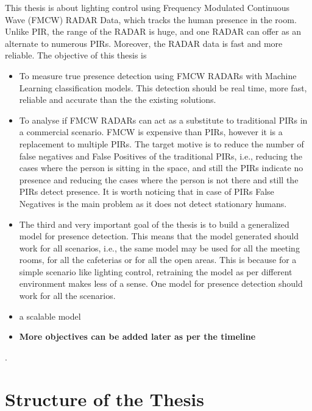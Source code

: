 This thesis is about lighting control using Frequency Modulated Continuous Wave (FMCW) RADAR Data, which tracks the human presence in the room. 
Unlike PIR, the range of the RADAR is huge, and one RADAR can offer as an alternate to numerous PIRs. Moreover, the RADAR data is fast and more reliable. The objective of this thesis is 
\begin{itemize}
    \item To measure true presence detection using FMCW RADARs with Machine Learning classification models. This detection should be real time, more fast, reliable and accurate than the the existing solutions.
    \item To analyse if FMCW RADARs can act as a substitute to traditional PIRs in a commercial scenario. FMCW is expensive than PIRs, however it is a replacement to multiple PIRs. The target motive is to reduce the number of false negatives and False Positives of the traditional PIRs, i.e., reducing the cases where the person is sitting in the space, and still the PIRs indicate no presence and reducing the cases where the person is not there and still the PIRs detect presence. It is worth noticing that in case of PIRs False Negatives is the main problem as it does not detect stationary humans. 
    \item The third and very important goal of the thesis is to build a generalized model for presence detection. This means that the model generated should work for all scenarios, i.e., the same model may be used for all the meeting rooms, for all the cafeterias or for all the open areas. This is because for a simple scenario like lighting control, retraining the model as per different environment makes less of a sense. One model for presence detection should work for all the scenarios.
    \item a scalable model
    \item \textbf{More objectives can be added later as per the timeline}
\end{itemize}.


\section{Structure of the Thesis}
\label{section:structure} 


